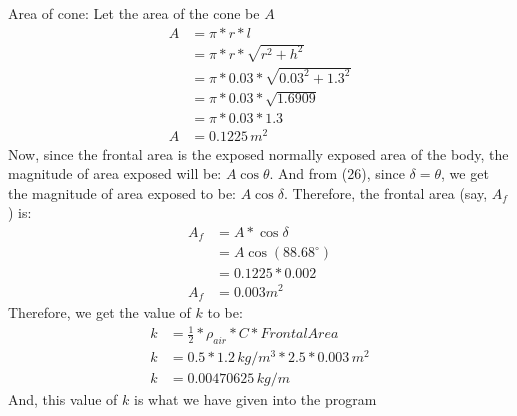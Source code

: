 \documentclass[12pt]{article}
\begin{document}
Area of cone: Let the area of the cone be $A$
\begin{align*}
    A &= \pi*r*l \\
    &= \pi*r*\sqrt{r^2 + h^2} \\
    &= \pi*0.03*\sqrt{{0.03}^2 + {1.3}^2} \\
    &= \pi*0.03*\sqrt{1.6909} \\
    &= \pi*0.03*1.3 \\
    A &= 0.1225 \,m^2
\end{align*}
Now, since the frontal area is the exposed normally exposed area of the body, the magnitude of area exposed will be: $A\cos\theta$. And from (26), since $\delta = \theta$, we get the magnitude of area exposed to be: $A\cos\delta$. Therefore, the frontal area (say, $A_f$) is:
\begin{align*}
    A_f &= A*\cos\delta \\
    &= A\cos(88.68^\circ) \\
    &= 0.1225*0.002 \\
    A_f &= 0.003 m^2
\end{align*}
Therefore, we get the value of $k$ to be:
\begin{align*}
    k &= \frac{1}{2}*\rho_{air}*C*Frontal Area\\
    k &= 0.5*1.2\,kg/m^3*2.5*0.003\,m^2 \\
    k &= 0.00470625\,kg/m
\end{align*}
And, this value of $k$ is what we have given into the program
\newpage
\end{document}
